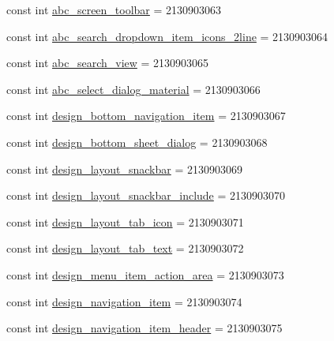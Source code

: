 \begin{CompactItemize}
\item 
const int \hyperlink{class__2doo_1_1_droid_1_1_resource_1_1_layout_a60310cd406c81765fa9600af1da05e1}{abc\_\-screen\_\-toolbar} = 2130903063
\item 
const int \hyperlink{class__2doo_1_1_droid_1_1_resource_1_1_layout_a376e47f1ddadf3ceeb98af724ab7b6d}{abc\_\-search\_\-dropdown\_\-item\_\-icons\_\-2line} = 2130903064
\item 
const int \hyperlink{class__2doo_1_1_droid_1_1_resource_1_1_layout_97369b0b812361fdc89b48776a370a0a}{abc\_\-search\_\-view} = 2130903065
\item 
const int \hyperlink{class__2doo_1_1_droid_1_1_resource_1_1_layout_9928b45b283271b92119d8b16e37adb1}{abc\_\-select\_\-dialog\_\-material} = 2130903066
\item 
const int \hyperlink{class__2doo_1_1_droid_1_1_resource_1_1_layout_46ca1f769ed43b26f31529cc6c9ce4f2}{design\_\-bottom\_\-navigation\_\-item} = 2130903067
\item 
const int \hyperlink{class__2doo_1_1_droid_1_1_resource_1_1_layout_38d1c4724713cd754da776f6c6e7183f}{design\_\-bottom\_\-sheet\_\-dialog} = 2130903068
\item 
const int \hyperlink{class__2doo_1_1_droid_1_1_resource_1_1_layout_f910a5c16721296e41c9c555a3863a3e}{design\_\-layout\_\-snackbar} = 2130903069
\item 
const int \hyperlink{class__2doo_1_1_droid_1_1_resource_1_1_layout_2b4da6be1ec2a0adf40ca214746a2b51}{design\_\-layout\_\-snackbar\_\-include} = 2130903070
\item 
const int \hyperlink{class__2doo_1_1_droid_1_1_resource_1_1_layout_00360a0a4d95bca335f77b825bed123d}{design\_\-layout\_\-tab\_\-icon} = 2130903071
\item 
const int \hyperlink{class__2doo_1_1_droid_1_1_resource_1_1_layout_3c7c09e85dca6d3d29ab4e9cdc7a7cc6}{design\_\-layout\_\-tab\_\-text} = 2130903072
\item 
const int \hyperlink{class__2doo_1_1_droid_1_1_resource_1_1_layout_834928a32158ae76a247fbeb5786633e}{design\_\-menu\_\-item\_\-action\_\-area} = 2130903073
\item 
const int \hyperlink{class__2doo_1_1_droid_1_1_resource_1_1_layout_32a613e7b870f9880707b43d41f13ec1}{design\_\-navigation\_\-item} = 2130903074
\item 
const int \hyperlink{class__2doo_1_1_droid_1_1_resource_1_1_layout_824363beca1a98368a8f60400cf9969e}{design\_\-navigation\_\-item\_\-header} = 2130903075
\item 

\end{CompactItemize}
